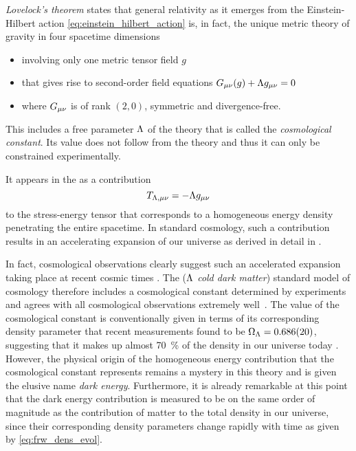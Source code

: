 \emph{Lovelock's theorem}\label{sec:lovelock} \autocite{Lovelock1971,Navarro2011,Clifton2012} states that general relativity as it emerges from the Einstein-Hilbert action \ref{eq:einstein_hilbert_action} is, in fact, the unique metric theory of gravity in four spacetime dimensions
\begin{itemize}
	\item involving only one metric tensor field \(g\)
	\item that gives rise to second-order field equations \(G_{\mu\nu}(g) + \Lambda g_{\mu\nu} = 0\)
	\item where \(G_{\mu\nu}\) is of rank \((2,0)\), symmetric and divergence-free.
\end{itemize}
This includes a free parameter \(\Lambda\) of the theory that is called the \emph{cosmological constant}. Its value does not follow from the theory and thus it can only be constrained experimentally.

It appears in the  as a contribution
\begin{equation}
	T_{\Lambda\textnormal{,}\mu\nu} = - \Lambda g_{\mu\nu}
\end{equation}
to the stress-energy tensor that corresponds to a homogeneous energy density penetrating the entire spacetime. In standard \FLRW{} cosmology, such a contribution results in an accelerating expansion of our universe as derived in detail in .

In fact, cosmological observations clearly suggest such an accelerated expansion taking place at recent cosmic times \autocite{Perlmutter2003}. The \LCDM{} (\emph{\(\Lambda\) cold dark matter}) standard model of cosmology therefore includes a cosmological constant determined by experiments and agrees with all cosmological observations extremely well~\autocite{Planck2015}. The value of the cosmological constant is conventionally given in terms of its corresponding density parameter that recent measurements found to be \(\Omega_\Lambda = \SI{0.686+-0.020}{}\), suggesting that it makes up almost \SI{70}{\percent} of the density in our universe today \autocite{Planck2013Data}. However, the physical origin of the homogeneous energy contribution that the cosmological constant represents remains a mystery in this theory and is given the elusive name \emph{dark energy}. Furthermore, it is already remarkable at this point that the dark energy contribution is measured to be on the same order of magnitude as the contribution of matter to the total density in our universe, since their corresponding density parameters change rapidly with time as given by \eqref{eq:frw_dens_evol}.

